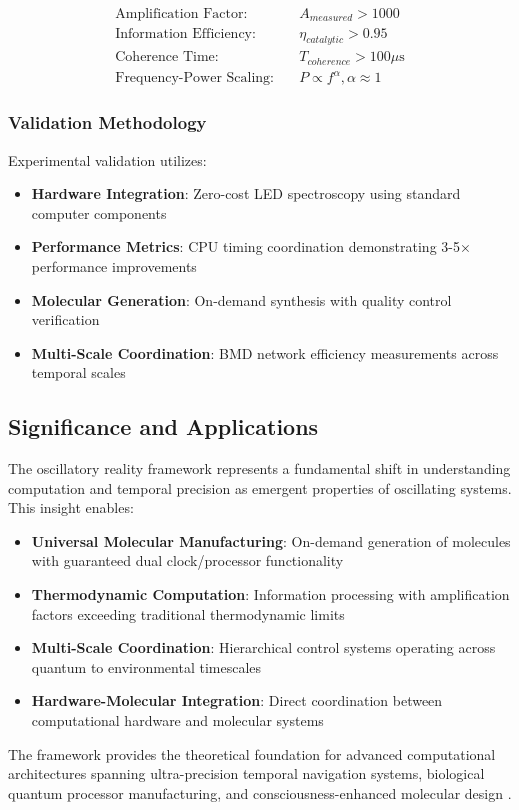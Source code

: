 \begin{align}
\text{Amplification Factor}: \quad &A_{measured} > 1000 \\
\text{Information Efficiency}: \quad &\eta_{catalytic} > 0.95 \\
\text{Coherence Time}: \quad &T_{coherence} > 100 \mu\text{s} \\
\text{Frequency-Power Scaling}: \quad &P \propto f^{\alpha}, \alpha \approx 1
\end{align}

\subsubsection{Validation Methodology}

Experimental validation utilizes:
\begin{itemize}
\item \textbf{Hardware Integration}: Zero-cost LED spectroscopy using standard computer components
\item \textbf{Performance Metrics}: CPU timing coordination demonstrating 3-5× performance improvements
\item \textbf{Molecular Generation}: On-demand synthesis with quality control verification \cite{sachikonye2024buhera}
\item \textbf{Multi-Scale Coordination}: BMD network efficiency measurements across temporal scales \cite{vedral2011living}
\end{itemize}

\subsection{Significance and Applications}

The oscillatory reality framework represents a fundamental shift in understanding computation and temporal precision as emergent properties of oscillating systems. This insight enables:

\begin{itemize}
\item \textbf{Universal Molecular Manufacturing}: On-demand generation of molecules with guaranteed dual clock/processor functionality
\item \textbf{Thermodynamic Computation}: Information processing with amplification factors exceeding traditional thermodynamic limits
\item \textbf{Multi-Scale Coordination}: Hierarchical control systems operating across quantum to environmental timescales
\item \textbf{Hardware-Molecular Integration}: Direct coordination between computational hardware and molecular systems
\end{itemize}

The framework provides the theoretical foundation for advanced computational architectures spanning ultra-precision temporal navigation systems, biological quantum processor manufacturing, and consciousness-enhanced molecular design \cite{sachikonye2024buhera,ball2011physics}.


